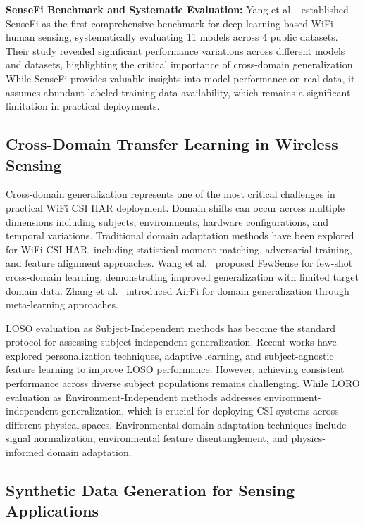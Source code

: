 \documentclass[journal]{IEEEtran}
\begin{document}
\textbf{SenseFi Benchmark and Systematic Evaluation:} Yang et al.~\cite{yang2023sensefi} established SenseFi as the first comprehensive benchmark for deep learning-based WiFi human sensing, systematically evaluating 11 models across 4 public datasets. Their study revealed significant performance variations across different models and datasets, highlighting the critical importance of cross-domain generalization. While SenseFi provides valuable insights into model performance on real data, it assumes abundant labeled training data availability, which remains a significant limitation in practical deployments.

\subsection{Cross-Domain Transfer Learning in Wireless Sensing}

Cross-domain generalization represents one of the most critical challenges in practical WiFi CSI HAR deployment. Domain shifts can occur across multiple dimensions including subjects, environments, hardware configurations, and temporal variations.
Traditional domain adaptation methods have been explored for WiFi CSI HAR, including statistical moment matching, adversarial training, and feature alignment approaches. Wang et al.~\cite{fewsense2022} proposed FewSense for few-shot cross-domain learning, demonstrating improved generalization with limited target domain data. Zhang et al.~\cite{airfi2022} introduced AirFi for domain generalization through meta-learning approaches.

LOSO evaluation as Subject-Independent methods has become the standard protocol for assessing subject-independent generalization. Recent works have explored personalization techniques, adaptive learning, and subject-agnostic feature learning to improve LOSO performance. However, achieving consistent performance across diverse subject populations remains challenging.
While LORO evaluation as Environment-Independent methods addresses environment-independent generalization, which is crucial for deploying CSI systems across different physical spaces. Environmental domain adaptation techniques include signal normalization, environmental feature disentanglement, and physics-informed domain adaptation.

\subsection{Synthetic Data Generation for Sensing Applications}
\end{document}
